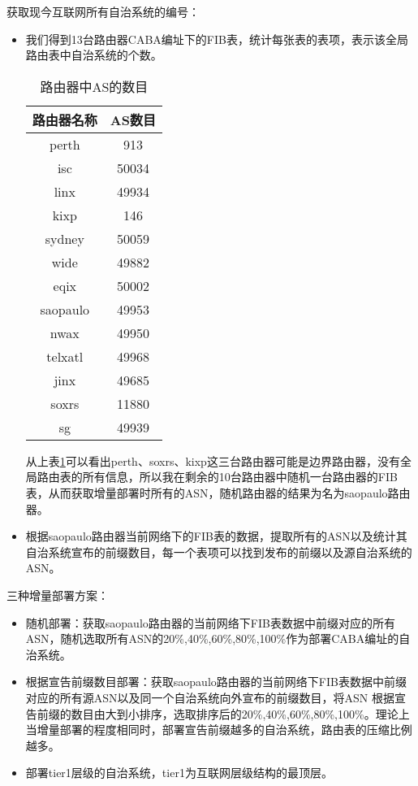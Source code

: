 获取现今互联网所有自治系统的编号：
\begin{itemize}
\item 我们得到13台路由器CABA编址下的FIB表，统计每张表的表项，表示该全局路由表中自治系统的个数。

    \begin{table}[h]
    \centering
    \caption{路由器中AS的数目}
    \label{tab:routeasnum}
        \begin{tabular}{|c|c|}
            \hline
            路由器名称 & AS数目 \\ \hline
            perth & 913 \\ \hline
            isc   & 50034 \\ \hline
            linx & 49934  \\ \hline
            kixp & 146 \\ \hline
            sydney& 50059  \\ \hline
            wide  & 49882  \\ \hline
            eqix  & 50002  \\ \hline
            saopaulo & 49953 \\ \hline
            nwax  & 49950   \\ \hline
            telxatl  & 49968 \\ \hline
            jinx  & 49685 \\ \hline
            soxrs  & 11880  \\ \hline
            sg    & 49939 \\  \hline
        \end{tabular}
    \end{table}

从上表\ref{tab:routeasnum}可以看出perth、soxrs、kixp这三台路由器可能是边界路由器，没有全局路由表的所有信息，所以我在剩余的10台路由器中随机一台路由器的FIB表，从而获取增量部署时所有的ASN，随机路由器的结果为名为saopaulo路由器。
\item 根据saopaulo路由器当前网络下的FIB表的数据，提取所有的ASN以及统计其自治系统宣布的前缀数目，每一个表项可以找到发布的前缀以及源自治系统的ASN。
\end{itemize}

三种增量部署方案：
\begin{itemize}
\item 随机部署：获取saopaulo路由器的当前网络下FIB表数据中前缀对应的所有ASN，随机选取所有ASN的20\%,40\%,60\%,80\%,100\%作为部署CABA编址的自治系统。
\item 根据宣告前缀数目部署：获取saopaulo路由器的当前网络下FIB表数据中前缀对应的所有源ASN以及同一个自治系统向外宣布的前缀数目，将ASN 根据宣告前缀的数目由大到小排序，选取排序后的20\%,40\%,60\%,80\%,100\%。理论上当增量部署的程度相同时，部署宣告前缀越多的自治系统，路由表的压缩比例越多。
\item 部署tier1层级的自治系统，tier1\cite{tier1}为互联网层级结构的最顶层。
\end{itemize}

